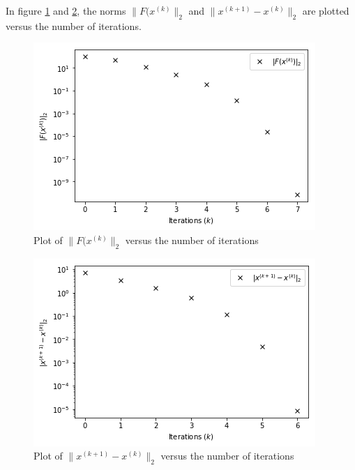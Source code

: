 \documentclass[12pt, a4paper,usenames,dvipsnames]{article}
\begin{document}
In figure \ref{fig:Fx} and \ref{fig:xfollow}, the norms \(\|F(x^{(k)}\|_2\) and \(\|x^{(k+1)}-x^{(k)}\|_2\) are plotted versus the number of iterations.
\begin{figure}
    \centering
    \includegraphics[width=\linewidth]{Fx.png}
    \caption{Plot of \(\|F(x^{(k)}\|_2\) versus the number of iterations}
    \label{fig:Fx}
\end{figure}
\begin{figure}
    \centering
    \includegraphics[width=\linewidth]{xfollow.png}
    \caption{Plot of \(\|x^{(k+1)}-x^{(k)}\|_2\) versus the number of iterations}
    \label{fig:xfollow}
\end{figure}



\newpage
\end{document}
